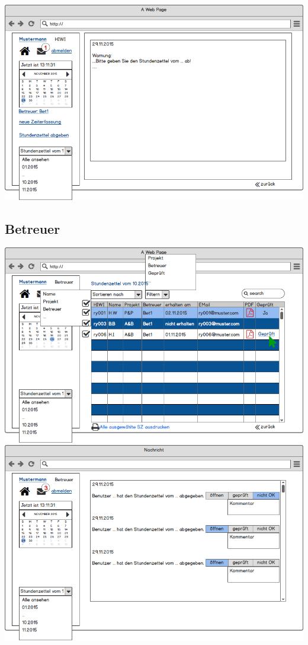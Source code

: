 \includegraphics[width=\linewidth]{UI/Benutzer/Nachricht.png}

\subsection{Betreuer}
\includegraphics[width=\linewidth]{UI/Betreuer/Hauptseite.png}\\
\includegraphics[width=\linewidth]{UI/Betreuer/Nachricht.png}

